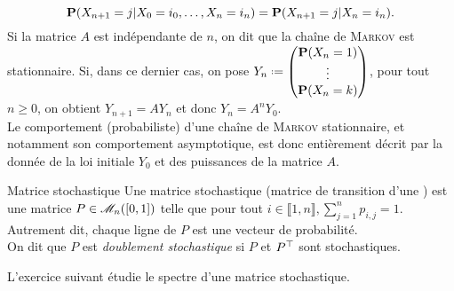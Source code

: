 $$\P(X_{n+1}=j | X_0=i_0, \dots, X_n = i_n) = \P(X_{n+1} = j | X_n = i_n).$$
Si la matrice $A$ est indépendante de $n$, on dit que la chaîne de \textsc{Markov} est stationnaire. Si, dans ce dernier cas, on pose $Y_n \defeq \begin{pmatrix} \P(X_n = 1) \\ \vdots \\ \P(X_n = k) \end{pmatrix}$, pour tout $n \geqslant 0$, on obtient $Y_{n+1} = A Y_n$ et donc $Y_n = A^n Y_0$. \\
Le comportement (probabiliste) d'une chaîne de \textsc{Markov} stationnaire, et notamment son comportement asymptotique, est donc entièrement décrit par la donnée de la loi initiale $Y_0$ et des puissances de la matrice $A$. 

\begin{defi}{Matrice stochastique}
    Une matrice stochastique (matrice de transition d'une ) est une matrice $P \in \M_n([0, 1])$ telle que pour tout $i \in \llbracket 1, n \rrbracket, \sum\limits_{j=1}^{n} p_{i,j} = 1$. \\ Autrement dit, chaque ligne de $P$ est une vecteur de probabilité. \\
    On dit que $P$ est \emph{doublement stochastique} si $P$ et $\Trsp{P}$ sont stochastiques.
\end{defi}

L'exercice suivant étudie le spectre d'une matrice stochastique. 

